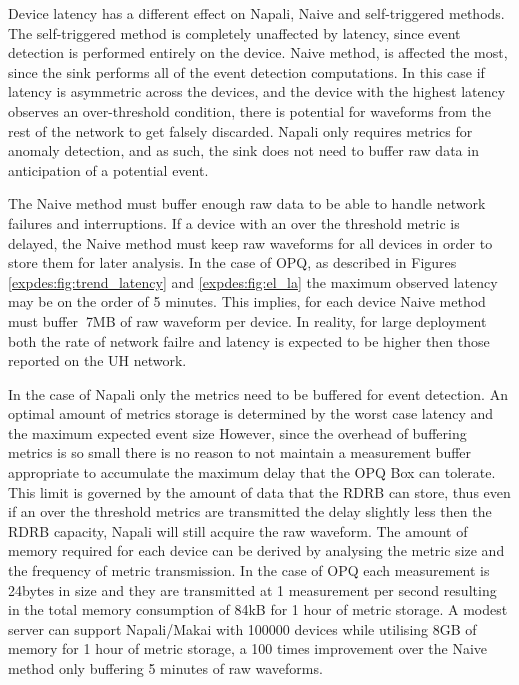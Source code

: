 Device latency has a different effect on Napali, Naive and self-triggered methods.
The self-triggered method is completely unaffected by latency, since event detection is performed entirely on the device.
Naive method, is affected the most, since the sink performs all of the event detection computations.
In this case if latency is asymmetric across the devices, and the device with the highest latency observes an over-threshold condition,
there is potential for waveforms from the rest of the network to get falsely discarded.
Napali only requires metrics for anomaly detection, and as such, the sink does not need to buffer raw data in anticipation of a potential event.

The Naive method must buffer enough raw data to be able to handle network failures and interruptions.
If a device with an over the threshold metric is delayed, the Naive method must keep raw waveforms for all devices in order to store them for later analysis.
In the case of OPQ, as described in Figures \ref{expdes:fig:trend_latency} and \ref{expdes:fig:el_la} the maximum observed latency may be on the order of 5 minutes.
This implies, for each device Naive method must buffer $~$7MB of raw waveform per device.
In reality, for large deployment both the rate of network failre and latency is expected to be higher then those reported on the UH network.

In the case of Napali only the metrics need to be buffered for event detection.
An optimal amount of metrics storage is determined by the worst case latency and the maximum expected event size
However, since the overhead of buffering metrics is so small there is no reason to not maintain a measurement buffer appropriate to accumulate the maximum delay that the OPQ Box can tolerate.
This limit is governed by the amount of data that the RDRB can store, thus even if an over the threshold metrics are transmitted the delay slightly less then the RDRB capacity, Napali will still acquire the raw waveform.
The amount of memory required for each device can be derived by analysing the metric size and the frequency of metric transmission.
In the case of OPQ each measurement is 24bytes in size and they are transmitted at 1 measurement per second resulting in the total memory consumption of 84kB for 1 hour of metric storage.
A modest server can support Napali/Makai with 100000 devices while utilising 8GB of memory for 1 hour of metric storage, a 100 times improvement over the Naive method only buffering 5 minutes of raw waveforms.

